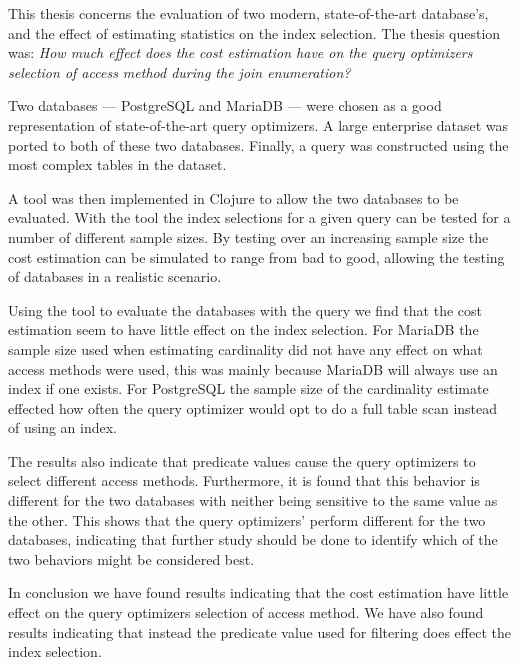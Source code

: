 This thesis concerns the evaluation of two modern, state-of-the-art database's,
and the effect of estimating statistics on the index selection. The thesis question was:
\textit{How much effect does the cost estimation have on the query optimizers
  selection of access method during the join enumeration?}

Two databases --- PostgreSQL and MariaDB --- were chosen as a good representation of
state-of-the-art query optimizers. A large enterprise dataset was ported to both
of these two databases. Finally, a query was constructed using the most complex
tables in the dataset.

A tool was then implemented in Clojure to allow the two databases to be
evaluated. With the tool the index selections for a given query can be tested
for a number of different sample sizes. By testing over an increasing sample
size the cost estimation can be simulated to range from bad to good, allowing
the testing of databases in a realistic scenario.

Using the tool to evaluate the databases with the query we find that the cost
estimation seem to have little effect on the index selection. For MariaDB the
sample size used when estimating cardinality did not have any effect on what
access methods were used, this was mainly because MariaDB will always use an
index if one exists. For PostgreSQL the sample size of the cardinality estimate
effected how often the query optimizer would opt to do a full table scan instead
of using an index.

The results also indicate that predicate values cause the query optimizers to
select different access methods. Furthermore, it is found that this behavior is
different for the two databases with neither being sensitive to the same value
as the other. This shows that the query optimizers' perform different for the
two databases, indicating that further study should be done to identify which of
the two behaviors might be considered best.

In conclusion we have found results indicating that the cost estimation have
little effect on the query optimizers selection of access method. We have also found
results indicating that instead the predicate value used for filtering does
effect the index selection.
